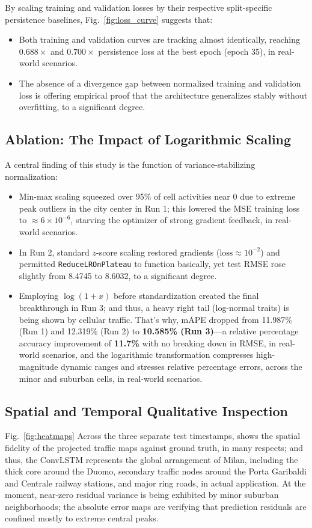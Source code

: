\documentclass[conference]{IEEEtran}
\begin{document}
By scaling training and validation losses by their respective split-specific persistence baselines, Fig.~\ref{fig:loss_curve} suggests that:
\begin{itemize}
    \item Both training and validation curves are tracking almost identically, reaching $0.688\times$ and $0.700\times$ persistence loss at the best epoch (epoch 35), in real-world scenarios.
    \item The absence of a divergence gap between normalized training and validation loss is offering empirical proof that the architecture generalizes stably without overfitting, to a significant degree.
\end{itemize}

\subsection{Ablation: The Impact of Logarithmic Scaling}
A central finding of this study is the function of variance-stabilizing normalization:
\begin{itemize}
    \item Min-max scaling squeezed over 95\% of cell activities near 0 due to extreme peak outliers in the city center in Run 1; this lowered the MSE training loss to $\approx 6 \times 10^{-6}$, starving the optimizer of strong gradient feedback, in real-world scenarios.
    \item In Run 2, standard $z$-score scaling restored gradients ($\text{loss} \approx 10^{-2}$) and permitted \texttt{ReduceLROnPlateau} to function basically, yet test RMSE rose slightly from 8.4745 to 8.6032, to a significant degree.
    \item Employing $\log(1+x)$ before standardization created the final breakthrough in Run 3; and thus, a heavy right tail (log-normal traits) is being shown by cellular traffic. That's why, mAPE dropped from 11.987\% (Run 1) and 12.319\% (Run 2) to \textbf{10.585\% (Run 3)}---a relative percentage accuracy improvement of \textbf{11.7\%} with no breaking down in RMSE, in real-world scenarios, and the logarithmic transformation compresses high-magnitude dynamic ranges and stresses relative percentage errors, across the minor and suburban cells, in real-world scenarios.
\end{itemize}

\subsection{Spatial and Temporal Qualitative Inspection}
Fig.~\ref{fig:heatmaps} Across the three separate test timestamps, shows the spatial fidelity of the projected traffic maps against ground truth, in many respects; and thus, the ConvLSTM represents the global arrangement of Milan, including the thick core around the Duomo, secondary traffic nodes around the Porta Garibaldi and Centrale railway stations, and major ring roads, in actual application. At the moment, near-zero residual variance is being exhibited by minor suburban neighborhoods; the absolute error maps are verifying that prediction residuals are confined mostly to extreme central peaks.
\end{document}
